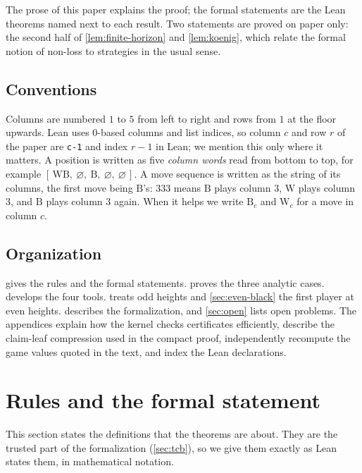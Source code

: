 \documentclass[11pt,a4paper]{article}
\theoremstyle{plain}
\theoremstyle{definition}
\newcommand{\code}[1]{{\upshape\texttt{\small\nolinkurl{#1}}}}
\newcommand{\B}{\mathrm{B}}
\newcommand{\W}{\mathrm{W}}
\newcommand{\col}[1]{[#1]}
\begin{document}
The prose of this paper explains the proof; the formal statements are the Lean theorems named next to each result. Two statements are proved on paper only: the second half of \cref{lem:finite-horizon} and \cref{lem:koenig}, which relate the formal notion of non-loss to strategies in the usual sense.

\subsection{Conventions}
\label{sec:conventions}

Columns are numbered $1$ to $5$ from left to right and rows from $1$ at the floor upwards. Lean uses $0$-based columns and list indices, so column $c$ and row $r$ of the paper are \code{c-1} and index $r-1$ in Lean; we mention this only where it matters. A position is written as five \emph{column words} read from bottom to top, for example $\col{\,\W\B,\ \varnothing,\ \B,\ \varnothing,\ \varnothing\,}$. A move sequence is written as the string of its columns, the first move being $\B$'s: $333$ means $\B$ plays column $3$, $\W$ plays column $3$, and $\B$ plays column $3$ again. When it helps we write $\B_c$ and $\W_c$ for a move in column $c$.

\subsection{Organization}

 gives the rules and the formal statements.  proves the three analytic cases.  develops the four tools.  treats odd heights and \cref{sec:even-black} the first player at even heights.  describes the formalization, and \cref{sec:open} lists open problems. The appendices explain how the kernel checks certificates efficiently, describe the claim-leaf compression used in the compact proof, independently recompute the game values quoted in the text, and index the Lean declarations.

\section{Rules and the formal statement}
\label{sec:rules}

This section states the definitions that the theorems are about. They are the trusted part of the formalization (\cref{sec:tcb}), so we give them exactly as Lean states them, in mathematical notation.
\end{document}
